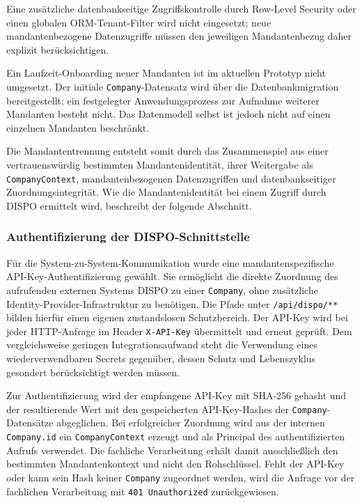\documentclass[
  12pt,
  a4paper,
  oneside
]{article}
\begin{document}
Eine zusätzliche datenbankseitige Zugriffskontrolle durch Row-Level Security
oder einen globalen ORM-Tenant-Filter wird nicht eingesetzt; neue
mandantenbezogene Datenzugriffe müssen den jeweiligen Mandantenbezug daher
explizit berücksichtigen.

Ein Laufzeit-Onboarding neuer Mandanten ist im aktuellen Prototyp nicht
umgesetzt. Der initiale \texttt{Company}-Datensatz wird über die
Datenbankmigration bereitgestellt; ein festgelegter Anwendungsprozess zur
Aufnahme weiterer Mandanten besteht nicht. Das Datenmodell selbst ist jedoch
nicht auf einen einzelnen Mandanten beschränkt.

Die Mandantentrennung entsteht somit durch das Zusammenspiel aus einer
vertrauenswürdig bestimmten Mandantenidentität, ihrer Weitergabe als
\texttt{CompanyContext}, mandantenbezogenen Datenzugriffen und
datenbankseitiger Zuordnungsintegrität. Wie die Mandantenidentität bei einem
Zugriff durch DISPO ermittelt wird, beschreibt der folgende Abschnitt.

\subsubsection{Authentifizierung der DISPO-Schnittstelle}
\label{sec:dispo-authentifizierung}

Für die System-zu-System-Kommunikation wurde eine mandantenspezifische
API-Key-Authentifizierung gewählt. Sie ermöglicht die direkte Zuordnung des
aufrufenden externen Systems DISPO zu einer \texttt{Company}, ohne zusätzliche
Identity-Provider-Infrastruktur zu benötigen. Die Pfade unter
\texttt{/api/dispo/**} bilden hierfür einen eigenen zustandslosen Schutzbereich.
Der API-Key wird bei jeder HTTP-Anfrage im Header
\texttt{X-API-Key} übermittelt und erneut geprüft. Dem vergleichsweise geringen
Integrationsaufwand steht die Verwendung eines wiederverwendbaren Secrets
gegenüber, dessen Schutz und Lebenszyklus gesondert berücksichtigt werden
müssen.

Zur Authentifizierung wird der empfangene API-Key mit SHA-256 gehasht und der
resultierende Wert mit den gespeicherten API-Key-Hashes der
\texttt{Company}-Datensätze abgeglichen. Bei erfolgreicher Zuordnung wird aus
der internen \texttt{Company.id} ein \texttt{CompanyContext} erzeugt und als
Principal des authentifizierten Aufrufs verwendet. Die fachliche Verarbeitung
erhält damit ausschließlich den bestimmten Mandantenkontext und nicht den
Rohschlüssel. Fehlt der API-Key oder kann sein Hash keiner \texttt{Company}
zugeordnet werden, wird die Anfrage vor der fachlichen Verarbeitung mit
\texttt{401 Unauthorized} zurückgewiesen.
\end{document}
